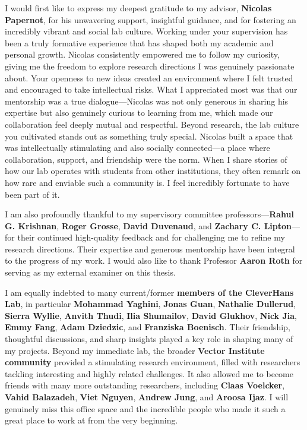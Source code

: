 \noindent I would first like to express my deepest gratitude to my advisor, \textbf{Nicolas Papernot}, for his unwavering support, insightful guidance, and for fostering an incredibly vibrant and social lab culture. Working under your supervision has been a truly formative experience that has shaped both my academic and personal growth. Nicolas consistently empowered me to follow my curiosity, giving me the freedom to explore research directions I was genuinely passionate about. Your openness to new ideas created an environment where I felt trusted and encouraged to take intellectual risks. What I appreciated most was that our mentorship was a true dialogue—Nicolas was not only generous in sharing his expertise but also genuinely curious to learning from me, which made our collaboration feel deeply mutual and respectful. Beyond research, the lab culture you cultivated stands out as something truly special. Nicolas built a space that was intellectually stimulating and also socially connected—a place where collaboration, support, and friendship were the norm. When I share stories of how our lab operates with students from other institutions, they often remark on how rare and enviable such a community is. I feel incredibly fortunate to have been part of it.

I am also profoundly thankful to my supervisory committee professors—\textbf{Rahul G. Krishnan}, \textbf{Roger Grosse}, \textbf{David Duvenaud}, and \textbf{Zachary C. Lipton}—for their continued high-quality feedback and for challenging me to refine my research directions. Their expertise and generous mentorship have been integral to the progress of my work. I would also like to thank Professor \textbf{Aaron Roth} for serving as my external examiner on this thesis.

I am equally indebted to many current/former \textbf{members of the CleverHans Lab}, in particular \textbf{Mohammad Yaghini}, \textbf{Jonas Guan}, \textbf{Nathalie Dullerud}, \textbf{Sierra Wyllie}, \textbf{Anvith Thudi}, \textbf{Ilia Shumailov}, \textbf{David Glukhov}, \textbf{Nick Jia}, \textbf{Emmy Fang}, \textbf{Adam Dziedzic}, and \textbf{Franziska Boenisch}. Their friendship, thoughtful discussions, and sharp insights played a key role in shaping many of my projects. Beyond my immediate lab, the broader \textbf{Vector Institute community} provided a stimulating research environment, filled with researchers tackling interesting and highly related challenges. It also allowed me to become friends with many more outstanding researchers, including \textbf{Claas Voelcker}, \textbf{Vahid Balazadeh}, \textbf{Viet Nguyen}, \textbf{Andrew Jung}, and \textbf{Aroosa Ijaz}. I will genuinely miss this office space and the incredible people who made it such a great place to work at from the very beginning.

